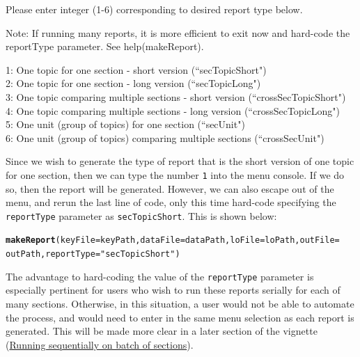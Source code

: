 \documentclass[11pt,a4paper,oldfontcommands,openany]{memoir}
\makeatletter
\newcommand{\hlstr}[1]{\textcolor[rgb]{0.192,0.494,0.8}{#1}}%
\newcommand{\hlstd}[1]{\textcolor[rgb]{0.345,0.345,0.345}{#1}}%
\newcommand{\hlkwc}[1]{\textcolor[rgb]{0.333,0.667,0.333}{#1}}%
\newcommand{\hlkwd}[1]{\textcolor[rgb]{0.737,0.353,0.396}{\textbf{#1}}}%
\newenvironment{kframe}{%
 \def\at@end@of@kframe{}%
 \ifinner\ifhmode%
  \def\at@end@of@kframe{\end{minipage}}%
  \begin{minipage}{\columnwidth}%
 \fi\fi%
 \def\FrameCommand##1{\hskip\@totalleftmargin \hskip-\fboxsep
 \colorbox{shadecolor}{##1}\hskip-\fboxsep
     \hskip-\linewidth \hskip-\@totalleftmargin \hskip\columnwidth}%
 \MakeFramed {\advance\hsize-\width
   \@totalleftmargin\z@ \linewidth\hsize
   \@setminipage}}%
 {\par\unskip\endMakeFramed%
 \at@end@of@kframe}
\newenvironment{knitrout}{}{} %
\numberwithin{equation}{section} %
\makeatother
\begin{document}
\begin{framed}
\vspace{2mm}
Please enter integer (1-6) corresponding to desired report type below.

Note: If running many reports, it is more efficient to exit now and hard-code the reportType parameter. See help(makeReport).

1: One topic for one section - short version (``secTopicShort")\\
2: One topic for one section - long version (``secTopicLong")\\
3: One topic comparing multiple sections - short version (``crossSecTopicShort")\\
4: One topic comparing multiple sections - long version (``crossSecTopicLong")\\
5: One unit (group of topics) for one section (``secUnit")\\
6: One unit (group of topics) comparing multiple sections (``crossSecUnit")
\end{framed}

Since we wish to generate the type of report that is the short version of one topic for one section, then we can type the number \texttt{1} into the menu console. If we do so, then the report will be generated. However, we can also escape out of the menu, and rerun the last line of code, only this time hard-code specifying the \texttt{reportType} parameter as \texttt{secTopicShort}. This is shown below: \\

\begin{knitrout}
\color{fgcolor}\begin{kframe}
\begin{alltt}
\hlkwd{makeReport}\hlstd{(}\hlkwc{keyFile} \hlstd{= keyPath,} \hlkwc{dataFile} \hlstd{= dataPath,} \hlkwc{loFile} \hlstd{= loPath,} \hlkwc{outFile} \hlstd{=}
  \hlstd{outPath,} \hlkwc{reportType} \hlstd{=} \hlstr{"secTopicShort"}\hlstd{)}
\end{alltt}
\end{kframe}
\end{knitrout}

The advantage to hard-coding the value of the \texttt{reportType} parameter is especially pertinent for users who wish to run these reports serially for each of many sections. Otherwise, in this situation, a user would not be able to automate the process, and would need to enter in the same menu selection as each report is generated. This will be made more clear in a later section of the vignette (\hyperref[sec:sequential]{Running sequentially on batch of sections}).
\end{document}
